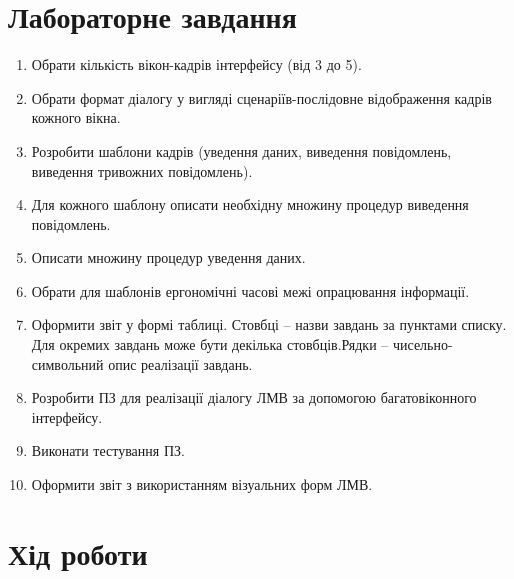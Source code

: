 \documentclass[14pt]{extreport}
\begin{document}
\begin{normalsize}
  \section*{Лабораторне завдання}
  \begin{enumerate}
  	\item Обрати кількість вікон-кадрів інтерфейсу (від 3 до 5).
  \item Обрати формат діалогу у вигляді сценаріїв-послідовне відображення кадрів кожного вікна.
  \item Розробити шаблони кадрів (уведення даних, виведення повідомлень, виведення тривожних повідомлень).
  \item Для кожного шаблону описати необхідну множину процедур виведення повідомлень.
  \item Описати множину процедур уведення даних.
  \item Обрати для шаблонів ергономічні часові межі опрацювання інформації.
  \item Оформити звіт у формі таблиці. Стовбці – назви завдань за пунктами списку. Для окремих завдань може бути декілька стовбців.Рядки – чисельно-символьний опис реалізації завдань.
  \item Розробити ПЗ для реалізації діалогу ЛМВ за допомогою багатовіконного інтерфейсу.
  \item Виконати тестування ПЗ.
  \item Оформити звіт з використанням візуальних форм ЛМВ.
  \end{enumerate}
  
  \section*{Хід роботи}
  

  \renewcommand{\tablename}{Таблиця}
  \renewcommand{\thetable}{\arabic{table}}
  \captionsetup{justification=raggedleft, singlelinecheck=false, labelsep=period}


\end{normalsize}
\end{document}
